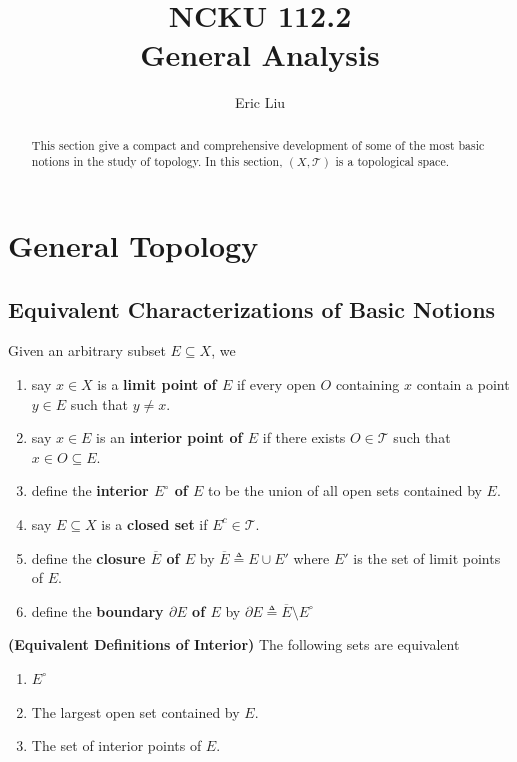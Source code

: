 \documentclass{report}
\title{\Huge{NCKU 112.2}\\
General Analysis}
\author{\huge{Eric Liu}}
\date{}
\begin{document}
\maketitle
\newpage%

\tableofcontents
\pagebreak

\chapter{General Topology}
\section{Equivalent Characterizations of Basic Notions}
\begin{abstract}
This section give a compact and comprehensive development of some of the most basic notions in the study of topology. In this section, $(X,\mathscr{T })$ is a topological space.
\end{abstract}
\begin{mdframed}
Given an arbitrary subset $E\subseteq X$, we 
\begin{enumerate}[label=(\alph*)]
  \item say $x\in X$ is a \textbf{limit point of $E$} if every open $O$ containing $x$ contain a point $y\in E$ such that $y \neq x$.
  \item say $x\in E$ is an \textbf{interior point of $E$} if there exists $O\in \mathscr{T }$ such that $x \in O \subseteq E$.
  \item define the \textbf{interior $E^\circ $ of $E$} to be the union of all open sets contained by  $E$.
   \item say $E\subseteq X$ is a \textbf{closed set} if $E^c \in \mathscr{T }$.
   \item define the \textbf{closure $\overline{E}$ of $E$} by $\overline{E}\triangleq E\cup E'$ where $E'$ is the set of limit points of $E$.
    \item define the \textbf{boundary $\partial E$ of $E$} by $\partial E\triangleq \overline{E}\setminus E^\circ $
\end{enumerate}
\end{mdframed}
\begin{theorem}
\textbf{(Equivalent Definitions of Interior)} The following sets are equivalent
\begin{enumerate}[label=(\alph*)]
  \item $E^\circ $
  \item The largest open set contained by $E$.
  \item The set of interior points of $E$.
\end{enumerate}
\end{theorem}
\end{document}
